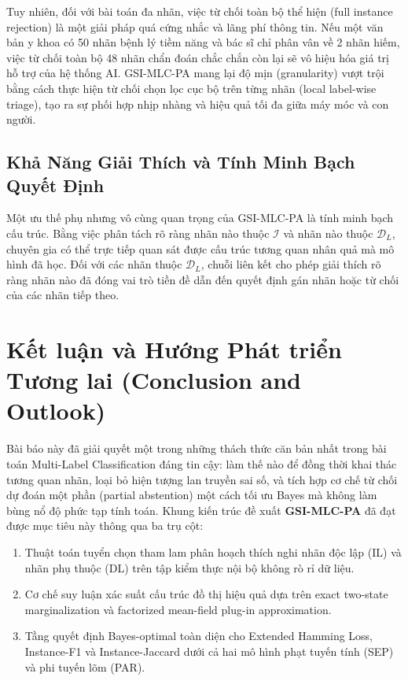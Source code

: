 \documentclass[11pt,a4paper]{article}
\begin{document}
Tuy nhiên, đối với bài toán đa nhãn, việc từ chối toàn bộ thể hiện (full instance rejection) là một giải pháp quá cứng nhắc và lãng phí thông tin. Nếu một văn bản y khoa có 50 nhãn bệnh lý tiềm năng và bác sĩ chỉ phân vân về 2 nhãn hiếm, việc từ chối toàn bộ 48 nhãn chẩn đoán chắc chắn còn lại sẽ vô hiệu hóa giá trị hỗ trợ của hệ thống AI. GSI-MLC-PA mang lại độ mịn (granularity) vượt trội bằng cách thực hiện từ chối chọn lọc cục bộ trên từng nhãn (local label-wise triage), tạo ra sự phối hợp nhịp nhàng và hiệu quả tối đa giữa máy móc và con người.

\subsection{Khả Năng Giải Thích và Tính Minh Bạch Quyết Định}
Một ưu thế phụ nhưng vô cùng quan trọng của GSI-MLC-PA là tính minh bạch cấu trúc. Bằng việc phân tách rõ ràng nhãn nào thuộc $\mathcal{I}$ và nhãn nào thuộc $\mathcal{D}_L$, chuyên gia có thể trực tiếp quan sát được cấu trúc tương quan nhân quả mà mô hình đã học. Đối với các nhãn thuộc $\mathcal{D}_L$, chuỗi liên kết cho phép giải thích rõ ràng nhãn nào đã đóng vai trò tiền đề dẫn đến quyết định gán nhãn hoặc từ chối của các nhãn tiếp theo.

\section{Kết luận và Hướng Phát triển Tương lai (Conclusion and Outlook)}
\label{sec:conclusion}

Bài báo này đã giải quyết một trong những thách thức căn bản nhất trong bài toán Multi-Label Classification đáng tin cậy: làm thế nào để đồng thời khai thác tương quan nhãn, loại bỏ hiện tượng lan truyền sai số, và tích hợp cơ chế từ chối dự đoán một phần (partial abstention) một cách tối ưu Bayes mà không làm bùng nổ độ phức tạp tính toán. Khung kiến trúc đề xuất \textbf{GSI-MLC-PA} đã đạt được mục tiêu này thông qua ba trụ cột:
\begin{enumerate}
    \item Thuật toán tuyển chọn tham lam phân hoạch thích nghi nhãn độc lập (IL) và nhãn phụ thuộc (DL) trên tập kiểm thực nội bộ không rò rỉ dữ liệu.
    \item Cơ chế suy luận xác suất cấu trúc đồ thị hiệu quả dựa trên exact two-state marginalization và factorized mean-field plug-in approximation.
    \item Tầng quyết định Bayes-optimal toàn diện cho Extended Hamming Loss, Instance-F1 và Instance-Jaccard dưới cả hai mô hình phạt tuyến tính (SEP) và phi tuyến lõm (PAR).
\end{enumerate}
\end{document}
